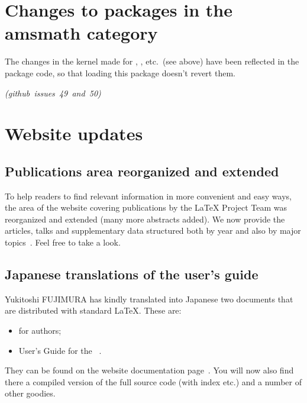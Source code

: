 \documentclass{ltnews}
\newcommand\githubissue[2][]{\ifhmode\unskip\fi
     \quad\penalty500\strut\nobreak\hfill
     \mbox{\small\itshape(github issue#1 #2)}\par}
\begin{document}
\section{Changes to packages in the amsmath category}

The changes in the kernel made for , ,
etc.\ (see above) have been reflected in the  package
code, so that loading this package doesn’t revert them.
%
\githubissue[s]{49 and 50}





\section{Website updates}

\subsection{Publications area reorganized and extended}

To help readers to find relevant information in more convenient and
easy ways, the area of the website covering publications by the
\LaTeX{} Project Team was reorganized and extended (many more
abstracts added). We now provide the articles, talks and supplementary
data structured both by year and also by major
topics~\cite{site-pub}. Feel free to take a look.

\subsection{Japanese translations of the user's guide}

Yukitoshi FUJIMURA has kindly translated
into Japanese two documents that are
distributed with standard \LaTeX{}.
These are: 
\begin{itemize}
\item
    \LaTeXe{} for authors;
\item
    User’s Guide for the ~\cite{amsldoc}.
\end{itemize}
They can be found on the website documentation page~\cite{site-doc}.
You will now also find there a compiled version of the full \LaTeXe{}
source code (with index etc.\@) and a number of other goodies.


      
\end{document}
